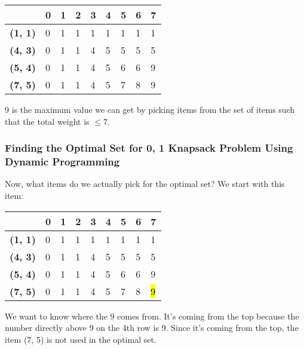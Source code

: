 \documentclass{article}
\begin{document}
\begin{center}
\begin{tabular}{|l|l|l|l|l|l|l|l|l|}
\hline
                & \textbf{0} & \textbf{1} & \textbf{2} & \textbf{3} & \textbf{4} & \textbf{5} & \textbf{6} & \textbf{7} \\ \hline
\textbf{(1, 1)} & 0          &1            &1            &1            &1            &1            &1            &1            \\ \hline
\textbf{(4, 3)} & 0          &1            &1            &4            &5            &5            &  5          &  5          \\ \hline
\textbf{(5, 4)} & 0          &1            &1            &4            &5            &6            &6            & 9           \\ \hline
\textbf{(7, 5)} & 0          & 1           & 1           &   4         &   5         &7            & 8           &9            \\ \hline
\end{tabular}
\end{center}
9 is the maximum value we can get by picking items from the set of items such that the total weight is $\le 7$.
\newpage
\subsubsection{Finding the Optimal Set for {0, 1} Knapsack Problem Using Dynamic Programming}
Now, what items do we actually pick for the optimal set? We start with this item:
\begin{center}
\begin{tabular}{|l|l|l|l|l|l|l|l|l|}
\hline
                & \textbf{0} & \textbf{1} & \textbf{2} & \textbf{3} & \textbf{4} & \textbf{5} & \textbf{6} & \textbf{7} \\ \hline
\textbf{(1, 1)} & 0          &1            &1            &1            &1            &1            &1            &1            \\ \hline
\textbf{(4, 3)} & 0          &1            &1            &4            &5            &5            &  5          &  5          \\ \hline
\textbf{(5, 4)} & 0          &1            &1            &4            &5            &6            &6            & 9           \\ \hline
\textbf{(7, 5)} & 0          & 1           & 1           &   4         &   5         &7            & 8           &\hl{9}            \\ \hline
\end{tabular}
\end{center}
We want to know where the 9 comes from. It's coming from the top because the number directly above 9 on the 4th row is 9. Since it's coming from the top, the item (7, 5) is not used in the optimal set.
\end{document}
